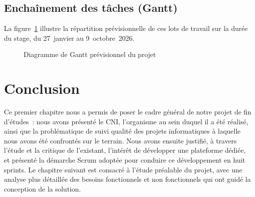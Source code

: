 \subsection{Enchaînement des tâches (Gantt)}
\label{subsec:gantt}

La figure~\ref{fig:gantt} illustre la répartition prévisionnelle de ces lots de travail sur la durée du stage, du 27~janvier au 9~octobre~2026. 

\begin{figure}[h!]
\centering
{}
\caption{Diagramme de Gantt prévisionnel du projet}
\label{fig:gantt}
\end{figure}

\section{Conclusion}
\label{sec:conclusion-chap1}

Ce premier chapitre nous a permis de poser le cadre général de notre projet de fin d'études~: nous avons présenté le CNI, l'organisme au sein duquel il a été réalisé, ainsi que la problématique de suivi qualité des projets informatiques à laquelle nous avons été confrontés sur le terrain. Nous avons ensuite justifié, à travers l'étude et la critique de l'existant, l'intérêt de développer une plateforme dédiée, et présenté la démarche Scrum adoptée pour conduire ce développement en huit sprints. Le chapitre suivant est consacré à l'étude préalable du projet, avec une analyse plus détaillée des besoins fonctionnels et non fonctionnels qui ont guidé la conception de la solution.
